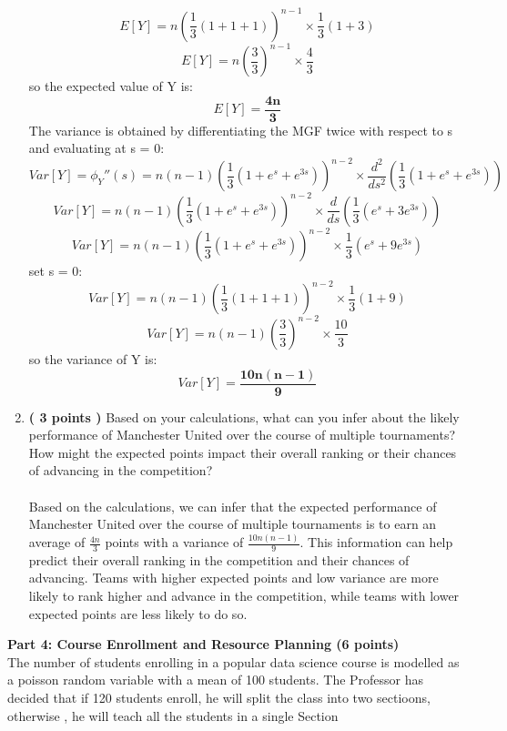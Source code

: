 \documentclass[a3paper,12pt]{extarticle} %
\begin{document}
\begin{enumerate}
\[        E[Y] = n\left(\frac{1}{3}(1 + 1 + 1)\right)^{n-1} \times \frac{1}{3}(1 + 3)
        \]
        \[
        E[Y] = n\left(\frac{3}{3}\right)^{n-1} \times \frac{4}{3}
        \]
        so the expected value of Y is:
        \[
        E[Y] = \mathbf{\frac{4n}{3}}
        \]
        The variance is obtained by differentiating the MGF twice with respect to s and evaluating at s = 0:
        \[
        Var[Y] = \phi_{Y}''(s) = n(n-1)\left(\frac{1}{3}(1 + e^{s} + e^{3s})\right)^{n-2} \times \frac{d^2}{ds^2}\left(\frac{1}{3}(1 + e^{s} + e^{3s})\right)
        \]
        \[
        Var[Y] = n(n-1)\left(\frac{1}{3}(1 + e^{s} + e^{3s})\right)^{n-2} \times \frac{d}{ds}\left(\frac{1}{3}(e^{s} + 3e^{3s})\right)
        \]
        \[
        Var[Y] = n(n-1)\left(\frac{1}{3}(1 + e^{s} + e^{3s})\right)^{n-2} \times \frac{1}{3}(e^{s} + 9e^{3s})
        \]
        set s = 0:
        \[
        Var[Y] = n(n-1)\left(\frac{1}{3}(1 + 1 + 1)\right)^{n-2} \times \frac{1}{3}(1 + 9)
        \]
        \[
        Var[Y] = n(n-1)\left(\frac{3}{3}\right)^{n-2} \times \frac{10}{3}
        \]
        so the variance of Y is:
        \[
        Var[Y] = \mathbf{\frac{10n(n-1)}{9}}
        \]
        \item \textbf{( 3 points )} Based on your calculations, what can you infer about the likely performance of Manchester United over the course of multiple tournaments? How might the expected points impact their overall ranking or their chances of advancing in the competition?
        \\\\ Based on the calculations, we can infer that the expected performance of Manchester United over the course of multiple tournaments is to earn an average of \(\frac{4n}{3}\) points with a variance of \(\frac{10n(n-1)}{9}\). This information can help predict their overall ranking in the competition and their chances of advancing. Teams with higher expected points and low variance are more likely to rank higher and advance in the competition, while teams with lower expected points are less likely to do so.
    \end{enumerate}
    \subitem \textbf{Part 4: Course Enrollment and Resource Planning (6 points)}
    \\ The number of students enrolling in a popular data science course is modelled as a poisson random variable with a mean of 100 students. The Professor has decided that if 120 students enroll, he will split the class into two sectioons, otherwise , he will teach all the students in a single Section
\end{document}
